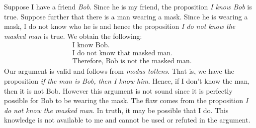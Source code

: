         \begin{example}
            \label{ex:Masked_Man_Fallacy}%
            Suppose I have a friend \textit{Bob}. Since he is my friend, the
            proposition \textit{I know Bob} is true. Suppose further that there
            is a man wearing a mask. Since he is wearing a mask, I do not know
            who he is and hence the proposition
            \textit{I do not know the masked man} is true. We obtain the
            following:
            \begin{subequations}
                \begin{align}
                    &\text{I know Bob}.\\
                    &\text{I do not know that masked man}.\\
                    &\text{Therefore, Bob is not the masked man}.
                \end{align}
            \end{subequations}
            Our argument is valid and follows from \textit{modus tollens}. That
            is, we have the proposition
            \textit{if the man is Bob, then I know him}. Hence, if I don't know
            the man, then it is not Bob. However this argument is not sound
            since it is perfectly possible for Bob to be wearing the mask. The
            flaw comes from the proposition
            \textit{I do not know the masked man}. In truth, it may be possible
            that I do. This knowledge is not available to me and cannot be used
            or refuted in the argument.
        \end{example}
